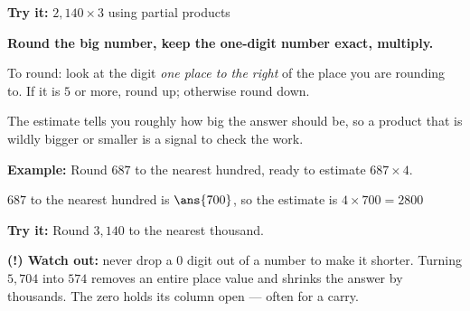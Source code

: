 \documentclass[12pt]{article}
\begin{document}
\begin{tryitbox}
\textbf{Try it:} \quad $2{,}140 \times 3$ using partial products\\[2pt]
\end{tryitbox}


\begin{formulabox}
\textbf{Round the big number, keep the one-digit number exact, multiply.}\par
To round: look at the digit \emph{one place to the right} of the place you are rounding to. If it is
$5$ or more, round up; otherwise round down.\par
The estimate tells you roughly how big the answer should be, so a product that is wildly bigger or
smaller is a signal to check the work.
\end{formulabox}

\begin{examplebox}
\textbf{Example:} \quad Round $687$ to the nearest hundred, ready to estimate $687 \times 4$.

$687$ to the nearest hundred is $\ans{700}$, so the estimate is $4 \times 700 = 2800$
\end{examplebox}

\begin{tryitbox}
\textbf{Try it:} \quad Round $3{,}140$ to the nearest thousand.\\[2pt]
\end{tryitbox}

\begin{watchoutbox}
\textbf{(!) Watch out:} never drop a $0$ digit out of a number to make it shorter. Turning
$5{,}704$ into $574$ removes an entire place value and shrinks the answer by thousands. The zero
holds its column open --- often for a carry.
\end{watchoutbox}
\end{document}
